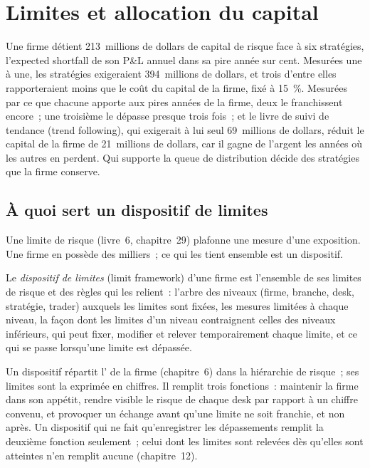 \chapter{Limites et allocation du capital}\label{ch:fm:limits-and-capital-allocation}

Une firme détient 213~millions de dollars de capital de risque face à six stratégies, l'expected shortfall de son P\&L annuel dans sa pire année sur cent.
Mesurées une à une, les stratégies exigeraient 394~millions de dollars, et trois d'entre elles rapporteraient moins que le coût du capital de la firme, fixé à 15~\%. Mesurées par
ce que chacune apporte aux pires années de la firme, deux le franchissent encore~; une troisième le dépasse presque trois fois~; et le
livre de suivi de tendance (trend following), qui exigerait à lui seul 69~millions de dollars, réduit le capital de la firme de 21~millions de dollars, car il gagne de l'argent les années où les autres en perdent. Qui supporte
la queue de distribution décide des stratégies que la firme conserve.

\section{À quoi sert un dispositif de limites}

Une limite de risque (livre~6, chapitre~29) plafonne une mesure d'une exposition. Une firme en possède des milliers~; ce qui les tient ensemble est un
dispositif.

\begin{definition}\label{def:fm:limits-and-capital-allocation:framework}
Le \emph{dispositif de limites} (limit framework) d'une firme est l'ensemble de ses limites de risque et des règles qui les relient~: l'arbre des niveaux
(firme, branche, desk, stratégie, trader) auxquels les limites sont fixées, les mesures limitées à chaque niveau, la façon dont les limites d'un niveau
contraignent celles des niveaux inférieurs, qui peut fixer, modifier et relever temporairement chaque limite, et ce qui se passe lorsqu'une limite est dépassée.
\end{definition}

Un dispositif répartit l' de la firme (chapitre~6) dans la hiérarchie de risque~; ses limites sont la  exprimée en chiffres. Il remplit
trois fonctions~: maintenir la firme dans son appétit, rendre visible le risque de chaque desk par rapport à un chiffre convenu, et provoquer un échange avant qu'une
limite ne soit franchie, et non après. Un dispositif qui ne fait qu'enregistrer les dépassements remplit la deuxième fonction seulement~; celui dont les limites sont relevées
dès qu'elles sont atteintes n'en remplit aucune (chapitre~12).

